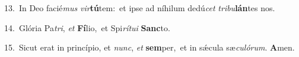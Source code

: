 {\numbfont\textcolor{\numbcolor}{13.}}~In Deo facié\textit{mus} \textit{vir}\-\textbf{tú}tem:~\star et ipse ad níhilum dedú\textit{cet} \textit{tri}\-\textit{bu}\textbf{lán}tes nos.\par
{\numbfont\textcolor{\numbcolor}{14.}}~Glória Pa\-\textit{tri}\-, \textit{et} \textbf{Fí}\-lio,~\star et Spi\-\textit{rí}\-\textit{tu}\textit{i} \textbf{Sanc}\-to.\par
{\numbfont\textcolor{\numbcolor}{15.}}~Sicut erat in princípio, et \textit{nunc}\-, \textit{et} \textbf{sem}\-per,~\star et in sǽcula sæ\-\textit{cu}\-\textit{ló}\textit{rum}. \textbf{A}\-men.\par
